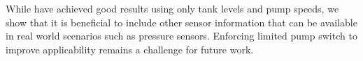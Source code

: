 While \cite{pei_real-time_2025} have achieved good results using only tank
levels and pump speeds, we show that it is beneficial to include other sensor
information that can be available in real world scenarios such as pressure
sensors. Enforcing limited pump switch to improve applicability remains a
challenge for future work.
